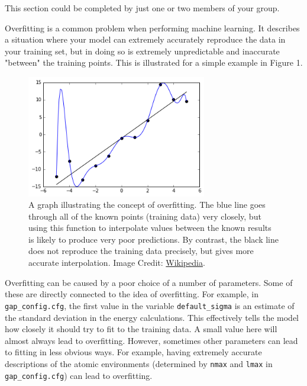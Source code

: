 \documentclass{article}
\begin{document}
This section could be completed by just one or two members of your group.

Overfitting is a common problem when performing machine learning. It describes a situation where your model can extremely accurately reproduce the data in your training set, but in doing so is extremely unpredictable and inaccurate "between" the training points. This is illustrated for a simple example in Figure 1.

\begin{figure}[t]

\centering

\includegraphics[width=0.7\textwidth]{Overfitted_Data.png}
\caption{A graph illustrating the concept of overfitting. The blue line goes through all of the known points (training data) very closely, but using this function to interpolate values between the known results is likely to produce very poor predictions. By contrast, the black line does not reproduce the training data precisely, but gives more accurate interpolation. Image Credit: \href{https://en.wikipedia.org/wiki/Overfitting}{Wikipedia}.}

\end{figure}

Overfitting can be caused by a poor choice of a number of parameters. Some of these are directly connected to the idea of overfitting. For example, in \verb|gap_config.cfg|, the first value in the variable \verb|default_sigma| is an estimate of the standard deviation in the energy calculations. This effectively tells the model how closely it should try to fit to the training data. A small value here will almost always lead to overfitting. However, sometimes other parameters can lead to fitting in less obvious ways. For example, having extremely accurate descriptions of the atomic environments (determined by \verb|nmax| and \verb|lmax| in \verb|gap_config.cfg|) can lead to overfitting.
\end{document}
